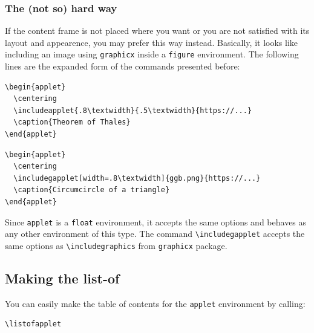 \documentclass[10pt,a4paper]{article}
\begin{document}
\subsubsection{The (not so) hard way}
If the content frame is not placed where you want or you are not satisfied with its layout and appearence, you may prefer this way instead. Basically, it looks like including an image using \verb|graphicx| inside a \verb|figure| environment. The following lines are the expanded form of the commands presented before:
\begin{lstlisting}[caption=Expanded form of Code \ref{lst:emp},frame=single]
\begin{applet}
  \centering
  \includeapplet{.8\textwidth}{.5\textwidth}{https://...}
  \caption{Theorem of Thales}
\end{applet}
\end{lstlisting}
\begin{lstlisting}[caption=Expanded form of Code \ref{lst:graph},frame=single]
\begin{applet}
  \centering
  \includegapplet[width=.8\textwidth]{ggb.png}{https://...}
  \caption{Circumcircle of a triangle}
\end{applet}
\end{lstlisting}
Since \verb|applet| is a \verb|float| environment, it accepts the same options and behaves as any other environment of this type. The command \verb|\includegapplet| accepts the same options as \verb|\includegraphics| from \verb|graphicx| package.
\subsection{Making the list-of}
You can easily make the table of contents for the \verb|applet| environment by calling:
\begin{lstlisting}[caption=List of applets,frame=single]
\listofapplet
\end{lstlisting}
\listofapplet
\end{document}
